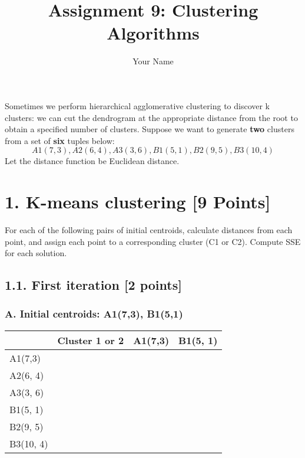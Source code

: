 \documentclass{article}
\title{Assignment 9: Clustering Algorithms}
\author{Your Name}
\begin{document}
\maketitle
Sometimes we perform hierarchical agglomerative clustering to discover k clusters: we can cut the dendrogram at the appropriate distance from the root to obtain a specified number of clusters.
Suppose we want to generate \textbf{two} clusters from a set of \textbf{six} tuples below:
\[ A1(7,3), A2(6,4), A3(3,6), B1(5,1), B2(9,5), B3(10,4) \]
Let the distance function be Euclidean distance.

\section*{1. K-means clustering [9 Points]} 

For each of the following pairs of initial centroids, calculate distances from each point, and assign each point to a corresponding cluster (C1 or C2). Compute SSE for each solution. 

\subsection*{1.1. First iteration [2 points]}

\subsubsection*{A. Initial centroids: A1(7,3), B1(5,1)}
\label{T11A}
\begin{table}[h]
\begin{tabular}{|l|l|l|l|}
\hline
          & Cluster 1 or 2 & A1(7,3) & B1(5, 1) \\ \hline
A1(7,3)   &                &         &          \\ \hline
A2(6, 4)  &                &         &          \\ \hline
A3(3, 6)  &                &         &          \\ \hline
B1(5, 1)  &                &         &          \\ \hline
B2(9, 5)  &                &         &          \\ \hline
B3(10, 4) &                &         &          \\ \hline
\end{tabular}
\end{table}
\label{T11A}
\end{document}
